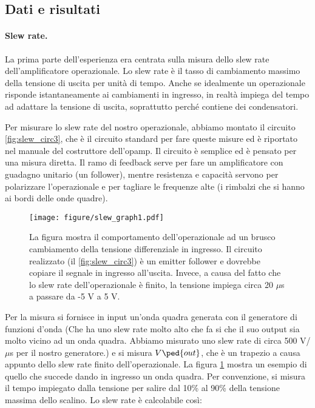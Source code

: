 \subsection{Dati e risultati}

\paragraph{Slew rate.}

La prima parte dell'esperienza era centrata sulla misura dello slew rate
dell'amplificatore operazionale. Lo slew rate è il tasso di cambiamento massimo
della tensione di uscita per unità di tempo. Anche se idealmente un operazionale
risponde istantaneamente ai cambiamenti in ingresso, in realtà impiega del tempo
ad adattare la tensione di uscita, soprattutto perché contiene dei condensatori.

Per misurare lo slew rate del nostro operazionale, abbiamo montato il circuito
\ref{fig:slew_circ3}, che è il circuito standard per fare queste misure ed
è riportato nel manuale del costruttore dell'opamp. Il circuito è semplice ed è pensato
per una misura diretta. Il ramo di feedback serve per fare un amplificatore 
con guadagno unitario (un follower), mentre resistenza e capacità servono per polarizzare
l'operazionale e per tagliare le frequenze alte (i rimbalzi che si hanno ai bordi delle onde quadre).

\begin{figure}[t]
    \texttt{[image: figure/slew\_graph1.pdf]}
    \caption{La figura mostra il comportamento dell'operazionale ad un brusco cambiamento della tensione
        differenziale in ingresso. Il circuito realizzato (il \ref{fig:slew_circ3}) è un emitter follower
        e dovrebbe copiare il segnale in ingresso all'uscita. Invece, a causa del fatto che lo slew rate
        dell'operazionale è finito, la tensione impiega circa 20 $\mu$s a passare da -5 V a 5 V.}
    \label{fig:slew_graph3}
\end{figure}

Per la misura si fornisce in input un'onda quadra generata con il generatore
di funzioni d'onda (Che ha uno slew rate molto alto che fa si che il suo output sia
molto vicino ad un onda quadra. Abbiamo misurato uno slew rate di circa 500 V/$\mu$s per
il nostro generatore.) e si misura $V\ped{out}$, che è un trapezio a causa appunto dello
slew rate finito dell'operazionale. La figura  \ref{fig:slew_graph3} mostra un esempio
di quello che succede dando in ingresso un onda quadra.
Per convenzione, si misura il tempo impiegato
dalla tensione per salire dal 10\% al 90\% della tensione massima dello scalino.
Lo slew rate è calcolabile così:

